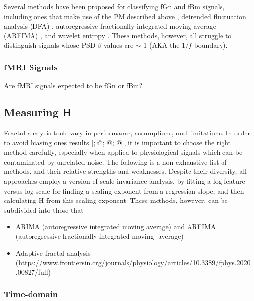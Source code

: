 \documentclass[
  sn-vancouver,
  Numbered,
  referee,
  lineno]{sn-jnl}
\providecommand{\tightlist}{%
  \setlength{\itemsep}{0pt}\setlength{\parskip}{0pt}}\usepackage{longtable,booktabs,array}
\begin{document}
Several methods have been proposed for classifying fGn and fBm signals,
including ones that make use of the PM described above
\citep{ekePhysiologicalTimeSeries2000, ekeFractalCharacterizationComplexity2002},
detrended fluctuation analysis (DFA)
\citep{pengLongrangeAnticorrelationsNonGaussian1993}, autoregressive
fractionally integrated moving average (ARFIMA)
\citep{grangerINTRODUCTIONLONGMEMORYTIME1980}, and wavelet entropy
\citep{ramirezpachecoDistinguishingStationaryNonstationary2012, ramirez-pachecoClassificationFractalSignals2017}.
These methods, however, all struggle to distinguish signals whose PSD
\(\beta\) values are \(\sim\) 1 \citep{ekePhysiologicalTimeSeries2000}
(AKA the \(1/f\) boundary).

\subsubsection{fMRI Signals}\label{fmri-signals}

Are fMRI signals expected to be fGn or fBm?

\subsection{Measuring H}\label{measuring-h}

Fractal analysis tools vary in performance, assumptions, and
limitations. In order to avoid biasing ones results
{[}\citet{bassingthwaighteEvaluatingRescaledRange1994}; @; @; @{]}, it
is important to choose the right method carefully, especially when
applied to physiological signals which can be contaminated by unrelated
noise. The following is a non-exhaustive list of methods, and their
relative strengths and weaknesses. Despite their diversity, all
approaches employ a version of scale-invariance analysis, by fitting a
log feature versus log scale for finding a scaling exponent from a
regression slope, and then calculating H from this scaling exponent.
These methods, however, can be subdivided into those that

\begin{itemize}
\tightlist
\item
  ARIMA (autoregressive integrated moving average) and ARFIMA
  (autoregressive fractionally integrated moving- average)
\item
  Adaptive fractal analysis
  (https://www.frontiersin.org/journals/physiology/articles/10.3389/fphys.2020.00827/full)
\end{itemize}

\subsubsection{Time-domain}\label{time-domain}
\end{document}
